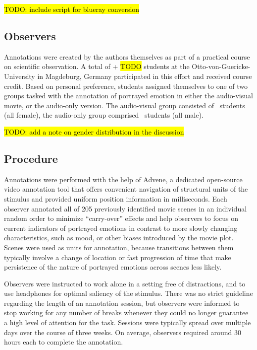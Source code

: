 \hl{TODO: include script for blueray conversion}

\subsection*{Observers}

Annotations were created by the authors themselves as part of a practical
course on scientific observation. A total of \AVTotalRaters +\AOTotalRaters
\hl{TODO} students at the Otto-von-Guericke-University in Magdeburg, Germany
participated in this effort and received course credit.  Based on personal
preference, students assigned themselves to one of two groups tasked with the
annotation of portrayed emotion in either the audio-visual movie, or the
audio-only version. The audio-visual group consisted of \AVTotalRaters\
students (all female), the audio-only group comprised \AOTotalRaters\ students
(all male).

\hl{TODO: add a note on gender distribution in the discussion}

\subsection*{Procedure}

Annotations were performed with the help of Advene\cite{AP2005}, a dedicated
open-source video annotation tool that offers convenient navigation of
structural units of the stimulus and provided uniform position information in
milliseconds.  Each observer annotated all of 205 previously identified movie
scenes in an individual random order to minimize ``carry-over'' effects and
help observers to focus on current indicators of portrayed emotions in contrast
to more slowly changing characteristics, such as mood, or other biases
introduced by the movie plot. Scenes were used as units for annotation, because
transitions between them typically involve a change of location or fast
progression of time that make persistence of the nature of portrayed emotions
across scenes less likely.

Observers were instructed to work alone in a setting free of distractions, and
to use headphones for optimal saliency of the stimulus. There was no strict
guideline regarding the length of an annotation session, but observers were
informed to stop working for any number of breaks whenever they could no longer
guarantee a high level of attention for the task. Sessions were typically
spread over multiple days over the course of three weeks. On average, observers
required around 30 hours each to complete the annotation.

